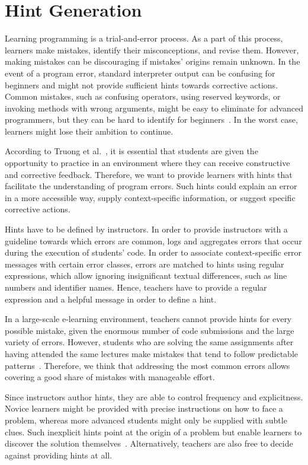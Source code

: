 \section{Hint Generation}\label{section:hint-generation1}

Learning programming is a trial-and-error process. As a part of this process, learners make mistakes, identify their misconceptions, and revise them. However, making mistakes can be discouraging if mistakes' origins remain unknown. In the event of a program error, standard interpreter output can be confusing for beginners and might not provide sufficient hints towards corrective actions. Common mistakes, such as confusing operators, using reserved keywords, or invoking methods with wrong arguments, might be easy to eliminate for advanced programmers, but they can be hard to identify for beginners~\cite{hristova2003identifying}. In the worst case, learners might lose their ambition to continue.

According to Truong et al.~\cite{truong2005learning}, it is essential that students are given the opportunity to practice in an environment where they can receive constructive and corrective feedback. Therefore, we want to provide learners with hints that facilitate the understanding of program errors. Such hints could explain an error in a more accessible way, supply context-specific information, or suggest specific corrective actions.

Hints have to be defined by instructors. In order to provide instructors with a guideline towards which errors are common, \tool logs and aggregates errors that occur during the execution of students' code. In order to associate context-specific error messages with certain error classes, errors are matched to hints using regular expressions, which allow ignoring insignificant textual differences, such as line numbers and identifier names. Hence, teachers have to provide a regular expression and a helpful message in order to define a hint.

In a large-scale e-learning environment, teachers cannot provide hints for every possible mistake, given the enormous number of code submissions and the large variety of errors. However, students who are solving the same assignments after having attended the same lectures make mistakes that tend to follow predictable patterns~\cite{singh2013automated}. Therefore, we think that addressing the most common errors allows covering a good share of mistakes with manageable effort.

Since instructors author hints, they are able to control frequency and explicitness. Novice learners might be provided with precise instructions on how to face a problem, whereas more advanced students might only be supplied with subtle clues. Such inexplicit hints point at the origin of a problem but enable learners to discover the solution themselves~\cite{vihavainen2012multi}. Alternatively, teachers are also free to decide against providing hints at all.
